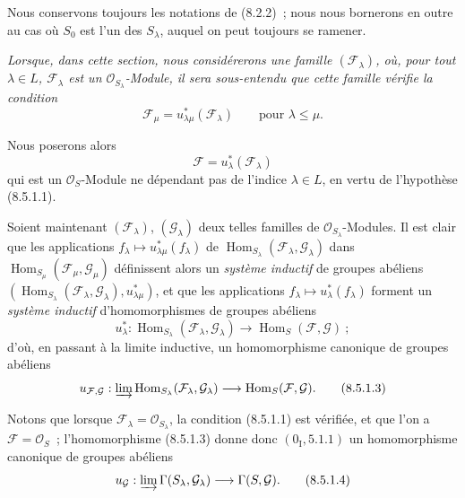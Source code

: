\begin{env}[8.5.1]
\label{IV.8.5.1-fr}
Nous conservons toujours les notations de (8.2.2)~; nous nous bornerons en
outre au cas où $S_0$ est l'un des $S_\lambda$, auquel on peut toujours se
ramener.

\emph{Lorsque, dans cette section, nous considérerons une famille
$(\mathcal F_\lambda)$, où, pour tout $\lambda\in L$, $\mathcal F_\lambda$ est
un $\mathcal O_{S_\lambda}$-Module, il sera sous-entendu que cette famille
vérifie la condition}
\begin{equation}
  \mathcal F_\mu=u_{\lambda\mu}^*(\mathcal F_\lambda)
  \qquad\text{pour }\lambda\leq\mu.
  \tag{8.5.1.1}\label{IV.8.5.1.1-fr}
\end{equation}

Nous poserons alors
\begin{equation}
  \mathcal F=u_\lambda^*(\mathcal F_\lambda)
  \tag{8.5.1.2}\label{IV.8.5.1.2-fr}
\end{equation}
qui est un $\mathcal O_S$-Module ne dépendant pas de l'indice $\lambda\in L$,
en vertu de l'hypothèse (8.5.1.1).

Soient maintenant $(\mathcal F_\lambda)$, $(\mathcal G_\lambda)$ deux telles
familles de $\mathcal O_{S_\lambda}$-Modules. Il est clair que les applications
$f_\lambda\mapsto u_{\lambda\mu}^*(f_\lambda)$ de
$\operatorname{Hom}_{S_\lambda}(\mathcal F_\lambda,\mathcal G_\lambda)$ dans
$\operatorname{Hom}_{S_\mu}(\mathcal F_\mu,\mathcal G_\mu)$ définissent alors
un \emph{système inductif} de groupes abéliens
$(\operatorname{Hom}_{S_\lambda}(\mathcal F_\lambda,\mathcal G_\lambda),
u_{\lambda\mu}^*)$, et que les applications
$f_\lambda\mapsto u_\lambda^*(f_\lambda)$ forment un \emph{système inductif}
d'homomorphismes de groupes abéliens
\[
  u_\lambda^*:\operatorname{Hom}_{S_\lambda}
  (\mathcal F_\lambda,\mathcal G_\lambda)
  \longrightarrow\operatorname{Hom}_S(\mathcal F,\mathcal G)~;
\]
d'où, en passant à la limite inductive, un homomorphisme canonique de groupes
abéliens
\begin{equation}
  u_{\mathcal F,\mathcal G}:
  \varinjlim\operatorname{Hom}_{S_\lambda}
  (\mathcal F_\lambda,\mathcal G_\lambda)
  \longrightarrow\operatorname{Hom}_S(\mathcal F,\mathcal G).
  \tag{8.5.1.3}\label{IV.8.5.1.3-fr}
\end{equation}

Notons que lorsque $\mathcal F_\lambda=\mathcal O_{S_\lambda}$, la condition
(8.5.1.1) est vérifiée, et que l'on a $\mathcal F=\mathcal O_S$~;
l'homomorphisme (8.5.1.3) donne donc $(0_{\mathrm I},5.1.1)$ un homomorphisme
canonique de groupes abéliens
\begin{equation}
  u_{\mathcal G}:\varinjlim\Gamma(S_\lambda,\mathcal G_\lambda)
  \longrightarrow\Gamma(S,\mathcal G).
  \tag{8.5.1.4}\label{IV.8.5.1.4-fr}
\end{equation}
\end{env}

